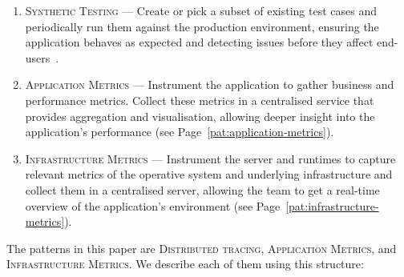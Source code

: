 \documentclass[runningheads]{llncs}
\begin{document}
{\begin{enumerate}
    \item \textsc{Synthetic Testing} --- Create or pick a subset of existing test cases and periodically run them against the production environment, ensuring the application behaves as expected and detecting issues before they affect end-users~\cite{Albuquerque-2022}.
    \item \textsc{Application Metrics} --- Instrument the application to gather business and performance metrics. Collect these metrics in a centralised service that provides aggregation and visualisation, allowing deeper insight into the application's performance (see Page~\ref{pat:application-metrics}).
    \item \textsc{Infrastructure Metrics} --- Instrument the server and runtimes to capture relevant metrics of the operative system and underlying infrastructure and collect them in a centralised server, allowing the team to get a real-time overview of the application's environment (see Page~\ref{pat:infrastructure-metrics}).
\end{enumerate}
}

The patterns in this paper are \textsc{Distributed tracing}, \textsc{Application Metrics}, and \textsc{Infrastructure Metrics}. We describe each of them using this structure:
\end{document}
